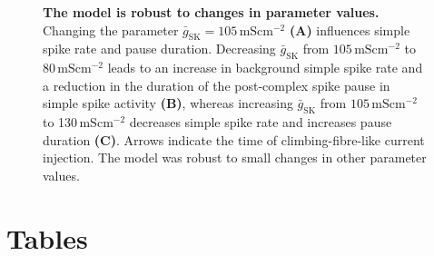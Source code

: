 \documentclass[utf8]{frontiersSCNS} %
\newcommand{\msi}{\,\mathrm{mS cm^{-2}}}
\newcommand{\sk}{\mathrm{SK}}
\begin{document}
\begin{figure}[!ht]
\caption{\textbf{The model is robust to changes in parameter values.}
 Changing the parameter $\bar{g}_\sk=105\msi$ \textbf{(A)} influences simple
  spike rate and pause duration. Decreasing $\bar{g}_\sk$ from
  $105\msi$ to 80$\msi$ leads to an increase in background simple spike
  rate and a reduction in the duration of the post-complex spike pause
  in simple spike activity \textbf{(B)}, whereas increasing
  $\bar{g}_\sk$ from $105\msi$ to 130$\msi$ decreases simple spike rate
  and increases pause duration \textbf{(C)}. Arrows indicate the time
  of climbing-fibre-like current injection. The model was robust to
  small changes in other parameter values.}
\label{S3_Fig}
\end{figure}








\section{Tables}
\end{document}
